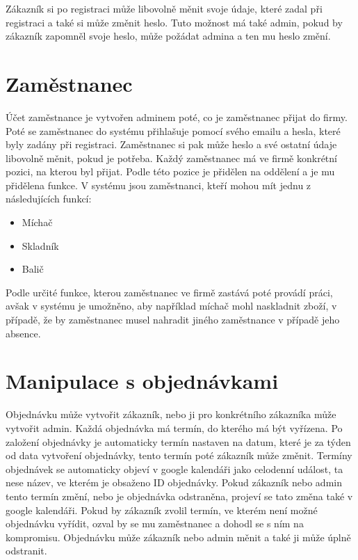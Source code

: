 Zákazník si po registraci může libovolně měnit svoje údaje, které zadal při registraci a také si může změnit heslo. Tuto možnost má také admin, pokud by zákazník zapomněl svoje heslo, může požádat admina a ten mu heslo změní.




\section{Zaměstnanec}

Účet zaměstnance je vytvořen adminem poté, co je zaměstnanec přijat do firmy. Poté se zaměstnanec do systému přihlašuje pomocí svého emailu a hesla, které byly zadány při registraci. Zaměstnanec si pak může heslo a své ostatní údaje libovolně měnit, pokud je potřeba. Každý zaměstnanec má ve firmě konkrétní pozici, na kterou byl přijat. Podle této pozice je přidělen na oddělení a je mu přidělena funkce. V systému jsou zaměstnanci, kteří mohou mít jednu z následujících funkcí: 



\begin{itemize}
  \item{Míchač}
  \item{Skladník}
  \item{Balič}
\end{itemize}

Podle určité funkce, kterou zaměstnanec ve firmě zastává poté provádí práci, avšak v systému je umožněno, aby například míchač mohl naskladnit zboží, v případě, že by zaměstnanec musel nahradit jiného zaměstnance v případě jeho absence. 

\section{Manipulace s objednávkami}

Objednávku může vytvořit zákazník, nebo ji pro konkrétního zákazníka může vytvořit admin. Každá objednávka má termín, do kterého má být vyřízena. Po založení objednávky je automaticky termín nastaven na datum, které je za týden od data vytvoření objednávky, tento termín poté zákazník může změnit. Termíny objednávek se automaticky objeví v google kalendáři jako celodenní událost, ta nese název, ve kterém je obsaženo ID objednávky. Pokud zákazník nebo admin tento termín změní, nebo je objednávka odstraněna, projeví se tato změna také v google kalendáři. Pokud by zákazník zvolil termín, ve kterém není možné objednávku vyřídit, ozval by se mu zaměstnanec a dohodl se s ním na kompromisu. Objednávku může zákazník nebo admin měnit a také ji může úplně odstranit.


